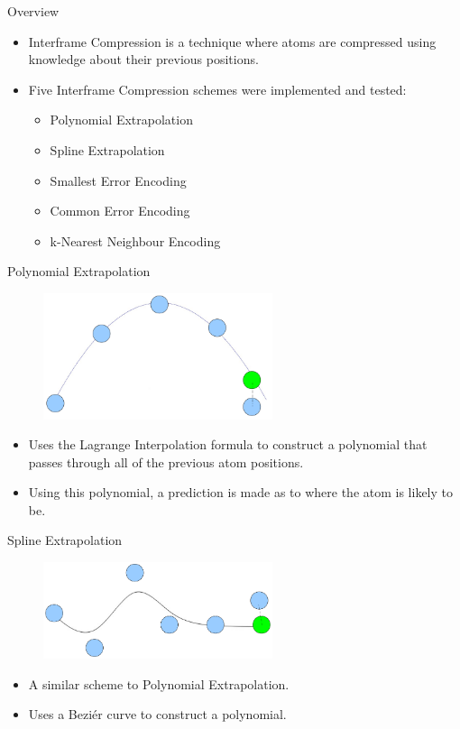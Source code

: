 \documentclass{beamer}
\begin{document}
\begin{frame}{Overview}
\begin{itemize}
 \item Interframe Compression is a technique where atoms are compressed using
   knowledge about their previous positions.

 \item Five Interframe Compression schemes were implemented and tested:
 \begin{itemize}
   \item Polynomial Extrapolation
   \item Spline Extrapolation
   \item Smallest Error Encoding
   \item Common Error Encoding
   \item k-Nearest Neighbour Encoding
 \end{itemize}
\end{itemize}
\end{frame}

\begin{frame}{Polynomial Extrapolation}
  \begin{figure}[h]
    \centering \includegraphics[width=0.6\textwidth]{julian-images/p1.png}
  \end{figure}
\begin{itemize}
 \item Uses the Lagrange Interpolation formula to construct a polynomial that
   passes through all of the previous atom positions.

 \item Using this polynomial, a prediction is made as to where the atom is
   likely to be.
\end{itemize}
\end{frame}

\begin{frame}{Spline Extrapolation}
  \begin{figure}[h]
    \centering \includegraphics[width=0.6\textwidth]{julian-images/p2.png}
  \end{figure}
\begin{itemize}
 \item A similar scheme to Polynomial Extrapolation.

 \item Uses a Bezi\'er curve to construct a polynomial.
\end{itemize}
\end{frame}
\end{document}
